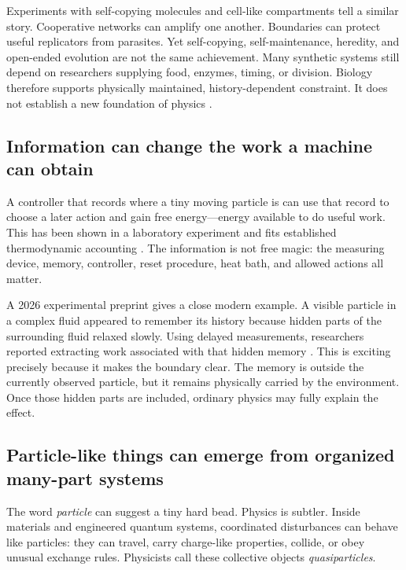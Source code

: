 \documentclass[11pt]{article}
\begin{document}
Experiments with self-copying molecules and cell-like compartments tell a
similar story. Cooperative networks can amplify one another. Boundaries can
protect useful replicators from parasites. Yet self-copying, self-maintenance,
heredity, and open-ended evolution are not the same achievement. Many synthetic
systems still depend on researchers supplying food, enzymes, timing, or
division. Biology therefore supports physically maintained, history-dependent
constraint. It does not establish a new foundation of physics
\citep{LincolnJoyce2009RNAReplication,VasasEtAl2010Evolvability,VaidyaEtAl2012CooperativeRNA,IchihashiEtAl2013RNACompartment}.

\subsection*{Information can change the work a machine can obtain}

A controller that records where a tiny moving particle is can use that record
to choose a later action and gain free energy---energy available to do useful
work. This has been shown in a laboratory experiment and fits established
thermodynamic accounting
\citep{SagawaUeda2010Feedback,ToyabeEtAl2010InformationEnergy}. The information
is not free magic: the measuring device, memory, controller, reset procedure,
heat bath, and allowed actions all matter.

A 2026 experimental preprint gives a close modern example. A visible particle
in a complex fluid appeared to remember its history because hidden parts of
the surrounding fluid relaxed slowly. Using delayed measurements, researchers
reported extracting work associated with that hidden memory
\citep{MurugaEtAl2026HiddenDegrees}. This is exciting precisely because it
makes the boundary clear. The memory is outside the currently observed
particle, but it remains physically carried by the environment. Once those
hidden parts are included, ordinary physics may fully explain the effect.

\subsection*{Particle-like things can emerge from organized many-part systems}

The word \emph{particle} can suggest a tiny hard bead. Physics is subtler.
Inside materials and engineered quantum systems, coordinated disturbances can
behave like particles: they can travel, carry charge-like properties, collide,
or obey unusual exchange rules. Physicists call these collective objects
\emph{quasiparticles}.
\end{document}

